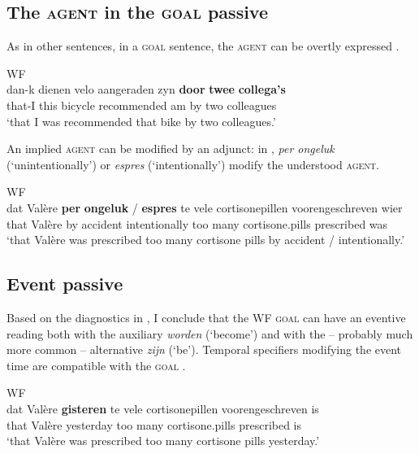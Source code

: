 \documentclass[output=paper]{langsci/langscibook}
\begin{document}
\subsection{The \textsc{agent} in the \textsc{goal}
passive}\label{sec:key:04.2.3}

As in other  sentences, in a \textsc{goal}  sentence, the
\textsc{agent} can be overtly expressed .

\ea%
    \label{ex:key:04.18}\glsdesc{WF}\\
    \gll dan-k    dienen velo   aangeraden   zyn   \textbf{door} \textbf{twee} \textbf{collega's}\\
    that-I   this bicycle   recommended am   by   two   colleagues\\
    \glt ‘that I was recommended that bike by two colleagues.’
\z

An implied \textsc{agent} can be modified by an adjunct: in ,
\emph{per ongeluk} (‘unintentionally’) or \emph{espres} (‘intentionally’)
modify the understood \textsc{agent}.\newpage

\ea%
    \label{ex:key:04.19}\glsdesc{WF}\\
    \gll dat   Valère    \textbf{per} \textbf{ongeluk} / \textbf{espres} te vele  cortisonepillen   voorengeschreven   wier\\
    that   Valère    by   accident {} intentionally too   many   cortisone.pills     prescribed     was\\
    \glt ‘that Valère was prescribed too many cortisone pills by accident /
    intentionally.’
\z

\subsection{Event passive}\label{sec:key:04.2.4} %

Based on the diagnostics in
\textcite{BroekhuisCornips2004,BroekhuisCornips2012}, I conclude that the
\gls{WF} \textsc{goal}  can have an eventive
reading both with the auxiliary \emph{worden} (‘become’) and
with the -- probably much more common -- alternative \emph{zijn} (‘be’).
Temporal specifiers modifying the event time are compatible with the
\textsc{goal}  .

\ea%
    \label{ex:key:04.20}\glsdesc{WF}\\
    \gll    dat   Valère    \textbf{gisteren} te   vele   cortisonepillen voorengeschreven   is\\
            that   Valère    yesterday too   many   cortisone.pills prescribed     is\\
    \glt    ‘that Valère was prescribed too many cortisone pills yesterday.’
\z
\end{document}
